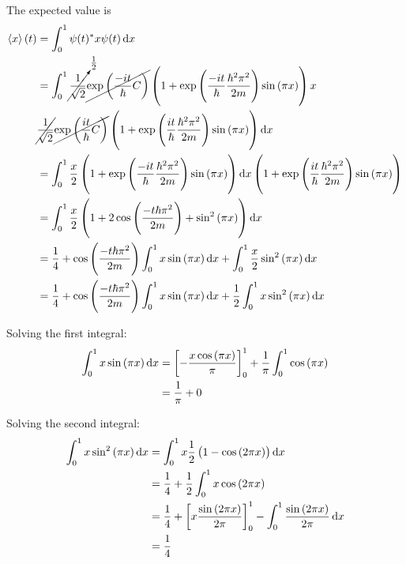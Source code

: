 \documentclass[a4paper,german,12pt,smallheadings]{scrartcl}
\begin{document}
\begin{enumerate}[a)]
    The expected value is
    \begin{align*}
      \braket{x}(t) &= \int_{0}^{1} \psi(t)^* x \psi(t) \dif x \\
                    &= \int_{0}^{1}
      \cancelto{\frac{1}{2}}{\frac{1}{\sqrt{2}}} \cancel{\exp\del{\frac{-it}{\hbar} C}} \del{1 + \exp\del{\frac{-it}{\hbar} \frac{\hbar^2 \pi^2}{2m}} \sin\del{\pi x}}
                       x \\
                       &\cancel{\frac{1}{\sqrt{2}}} \cancel{\exp\del{\frac{it}{\hbar} C}} \del{1 + \exp\del{\frac{it}{\hbar} \frac{\hbar^2 \pi^2}{2m}} \sin\del{\pi x}}
                        \dif x \\
                    &=
                       \int_0^1 \frac{x}{2} \del{1 + \exp\del{\frac{-it}{\hbar} \frac{\hbar^2 \pi^2}{2m}} \sin\del{\pi x}} \dif x
                       \del{1 + \exp\del{\frac{it}{\hbar} \frac{\hbar^2 \pi^2}{2m}} \sin\del{\pi x}} \\
                       &= \int_0^1 \frac{x}{2}\del{1 + 2\cos\del{\frac{-t \hbar \pi^2}{2m}} + \sin^2\del{\pi x}} \dif x \\
                       &= \frac{1}{4} + \cos\del{\frac{-t \hbar \pi^2}{2m}} \int_0^1 x \sin\del{\pi x} \dif x + \int_0^1 \frac{x}{2} \sin^2\del{\pi x} \dif x\\
                       &= \frac{1}{4} + \cos\del{\frac{-t \hbar \pi^2}{2m}} \int_0^1 x \sin\del{\pi x} \dif x + \frac{1}{2} \int_0^1 x \sin^2\del{\pi x} \dif x\\
    \end{align*}

    Solving the first integral:
    \begin{align*}
      \int_0^1 x \sin\del{\pi x} \dif x  &= \sbr{-\frac{x\cos\del{\pi x}}{\pi}}_0^1 + \frac{1}{\pi} \int_0^1 \cos\del{\pi x} \\
                                         &= \frac{1}{\pi} + 0
    \end{align*}

    Solving the second integral:
    \begin{align*}
      \int_0^1 x \sin^2\del{\pi x} \dif x  &= \int_0^1 x \frac{1}{2} \del{1- \cos\del{2 \pi x}} \dif x \\
                                           &= \frac{1}{4} + \frac{1}{2} \int_0^1 x \cos\del{2 \pi x} \\
                                           &= \frac{1}{4} + \sbr{x \frac{\sin\del{2 \pi x}}{2 \pi}}_0^1 - \int_0^1 \frac{\sin\del{2 \pi x}}{2 \pi} \dif x \\
                                           &= \frac{1}{4}
    \end{align*}


\end{enumerate}
\end{document}
